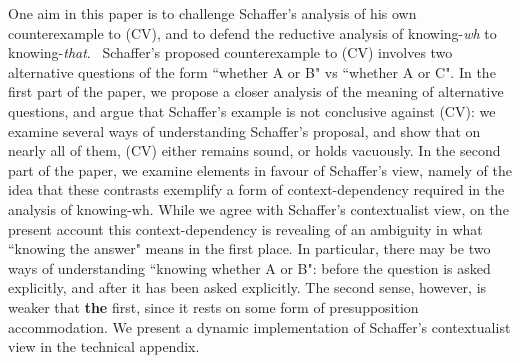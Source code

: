 One aim in this paper is to challenge Schaffer's analysis of his
own counterexample to (CV), and to defend the reductive analysis
of knowing-\emph{wh} to knowing-\emph{that}.
\ Schaffer's proposed counterexample to (CV) involves two
alternative questions of the form ``whether A or B" vs ``whether A
or C". In the first part of the paper, we propose a closer
analysis of the meaning of alternative questions, and argue that
Schaffer's example is not conclusive against (CV): we examine
several ways of understanding Schaffer's proposal, and show that
on nearly all of them, (CV) either remains sound, or holds
vacuously. In the second part of the paper, we examine elements in
favour of Schaffer's view, namely of the idea that these contrasts
exemplify a form of context-dependency required in the analysis of
knowing-wh. While we agree with Schaffer's contextualist view, on
the present account this context-dependency is revealing of an
ambiguity in what ``knowing the answer" means in the first place.
In particular, there may be two ways of understanding ``knowing
whether A or B": before the question is asked explicitly, and
after it has been asked explicitly. The second sense, however, is
weaker that {\bf the} first, since it rests on some form of
presupposition accommodation. We present a dynamic implementation
of Schaffer's contextualist view in the technical appendix.
